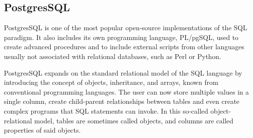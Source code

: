 \subsection{PostgresSQL}
\label{subsec:background:first_section:second_subsection}
\par PostgresSQL is one of the most popular open-source implementations of the SQL paradigm\citep{worsleyPostgresSQL}. It also includes its own programming language, PL/pgSQL, used to create advanced procedures and to include external scripts from other languages usually not associated with relational databases, such as Perl or Python. 

\par PostgresSQL expands on the standard relational model of the SQL language by introducing the concept of objects, inheritance, and arrays, known from conventional programming languages. The user can now store multiple values in a single column, create child-parent relationships between tables and even create complex programs that SQL statements can invoke. In this so-called object-relational model, tables are sometimes called objects, and columns are called properties of said objects\citep{ACID}.

